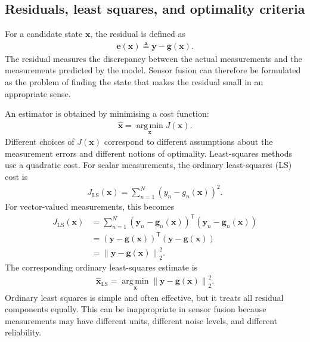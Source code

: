 \documentclass[graybox,envcountchap]{style/SNmono}
\begin{document}
\subsection{Residuals, least squares, and optimality criteria}

For a candidate state $\mathbf{x}$, the residual is defined as
\begin{align}
\mathbf{e}(\mathbf{x}) \triangleq \mathbf{y} - \mathbf{g}(\mathbf{x}).
\end{align}
The residual measures the discrepancy between the actual measurements and the measurements predicted by the model. Sensor fusion can therefore be formulated as the problem of finding the state that makes the residual small in an appropriate sense.

An estimator is obtained by minimising a cost function:
\begin{align}
\widehat{\mathbf{x}} = \operatorname*{arg\,min}_{\mathbf{x}} J(\mathbf{x}).
\end{align}
Different choices of $J(\mathbf{x})$ correspond to different assumptions about the measurement errors and different notions of optimality. Least-squares methods use a quadratic cost. For scalar measurements, the ordinary least-squares (LS) cost is
\begin{align}
J_{\mathrm{LS}}(\mathbf{x}) = \sum_{n=1}^{N}\left(y_n-g_n(\mathbf{x})\right)^2.
\end{align}
For vector-valued measurements, this becomes
\begin{align}
J_{\mathrm{LS}}(\mathbf{x}) &=\sum_{n=1}^{N}\left(\mathbf{y}_n-\mathbf{g}_n(\mathbf{x})\right)^{\mathsf T}\left(\mathbf{y}_n-\mathbf{g}_n(\mathbf{x})\right) \nonumber \\
&= \left( \mathbf{y} - \mathbf{g}(\mathbf{x}) \right)^{\mathsf T}\left(\mathbf{y}-\mathbf{g}(\mathbf{x})\right) \nonumber \\
& = \left\|\mathbf{y} - \mathbf{g}(\mathbf{x}) \right\|_2^2 . 
\end{align}
The corresponding ordinary least-squares estimate is
\begin{align}
\widehat{\mathbf{x}}_{\mathrm{LS}} = \operatorname*{arg\,min}_{\mathbf{x}} \left\| \mathbf{y} - \mathbf{g}(\mathbf{x}) \right\|_2^2.
\end{align}
Ordinary least squares is simple and often effective, but it treats all residual components equally. This can be inappropriate in sensor fusion because measurements may have different units, different noise levels, and different reliability.
\end{document}

